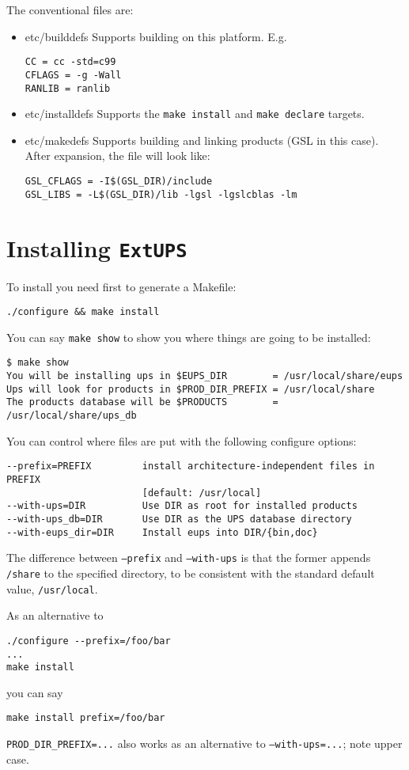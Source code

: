 \documentclass{article}
\newcommand{\code}[1]{\texttt{#1}}
\newcommand{\eups}{\code{ExtUPS}}
\begin{document}
The conventional files are:
\begin{itemize}
   \item{etc/builddefs}
     Supports building on this platform. E.g.
\begin{verbatim}
CC = cc -std=c99
CFLAGS = -g -Wall
RANLIB = ranlib
\end{verbatim}
  
   \item{etc/installdefs}
     Supports the \texttt{make install} and \texttt{make declare} targets.
  
   \item{etc/makedefs}
     Supports building and linking products (GSL in this case). After
     expansion, the file will look like:
\begin{verbatim}
GSL_CFLAGS = -I$(GSL_DIR)/include
GSL_LIBS = -L$(GSL_DIR)/lib -lgsl -lgslcblas -lm
\end{verbatim}
\end{itemize}
  
\section{Installing \eups{}}
  
  To install you need first to generate a Makefile:
\begin{verbatim}
./configure && make install
\end{verbatim}

You can say \texttt{make show} to show you where things are
going to be installed:
\begin{verbatim}
$ make show
You will be installing ups in $EUPS_DIR        = /usr/local/share/eups
Ups will look for products in $PROD_DIR_PREFIX = /usr/local/share
The products database will be $PRODUCTS        = /usr/local/share/ups_db
\end{verbatim}

You can control where files are put with the following configure options:
\begin{verbatim}
--prefix=PREFIX         install architecture-independent files in PREFIX
                        [default: /usr/local]
--with-ups=DIR          Use DIR as root for installed products
--with-ups_db=DIR       Use DIR as the UPS database directory
--with-eups_dir=DIR     Install eups into DIR/{bin,doc}
\end{verbatim}
The difference between \texttt{--prefix} and \texttt{--with-ups}
is that the former appends \texttt{/share} to the specified directory, to
be consistent with the standard default value, \texttt{/usr/local}.
  
As an alternative to
\begin{verbatim}
./configure --prefix=/foo/bar
...
make install
\end{verbatim}
you can say
\begin{verbatim}
make install prefix=/foo/bar
\end{verbatim}
\texttt{PROD\_DIR\_PREFIX=...} also works as an alternative to \texttt{--with-ups=...};
note upper case.
\end{document}
